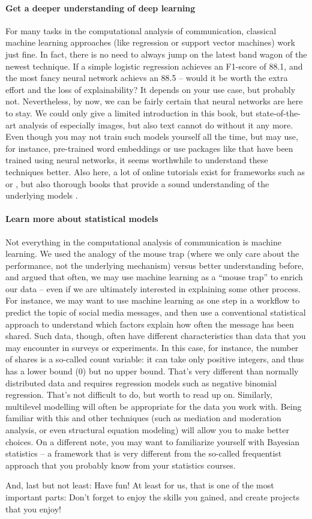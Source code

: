 \paragraph{Get a deeper understanding of deep learning} For many tasks in the computational analysis of communication, classical machine learning approaches (like regression or support vector machines) work just fine. In fact, there is no need to always jump on the latest band wagon of the newest technique. If a simple logistic regression achieves an F1-score of 88.1, and the most fancy neural network achievs an 88.5 -- would it be worth the extra effort and the loss of explainability? It depends on your use case, but probably not. Nevertheless, by now, we can be fairly certain that neural networks are here to stay. We could only give a limited introduction in this book, but state-of-the-art analysis of especially images, but also text cannot do without it any more. Even though you may not train such models yourself all the time, but may use, for instance, pre-trained word embeddings or use packages like  that have been trained using neural networks, it seems worthwhile to understand these techniques better. Also here, a lot of online tutorials exist for frameworks such as  or , but also thorough books that provide a sound understanding of the underlying models \cite{goldberg2017}.


\paragraph{Learn more about statistical models} Not everything in the computational analysis of communication is machine learning. We used the analogy of the mouse trap (where we only care about the performance, not the underlying mechanism) versus better understanding before, and argued that often, we may use machine learning as a ``mouse trap'' to enrich our data -- even if we are ultimately interested in explaining some other process. For instance, we may want to use machine learning as one step in a workflow to predict the topic of social media messages, and then use a conventional statistical approach to understand which factors explain how often the message has been shared. Such data, though, often have different characteristics than data that you may encounter in surveys or experiments. In this case, for instance, the number of shares is a so-called count variable: it can take only positive integers, and thus has a lower bound (0) but no upper bound. That's very different than normally distributed data and requires regression models such as negative binomial regression. That's not difficult to do, but worth to read up on. Similarly, multilevel modelling will often be appropriate for the data you work with. Being familiar with this and other techniques (such as mediation and moderation analysis, or even structural equation modeling) will allow you to make better choices. On a different note, you may want to familiarize yourself with Bayesian statistics -- a framework that is very different from the so-called frequentist approach that you probably know from your statistics courses.


And, last but not least: Have fun! At least for us, that is one of the most important parts: Don't forget to enjoy the skills you gained, and create projects that you enjoy!




